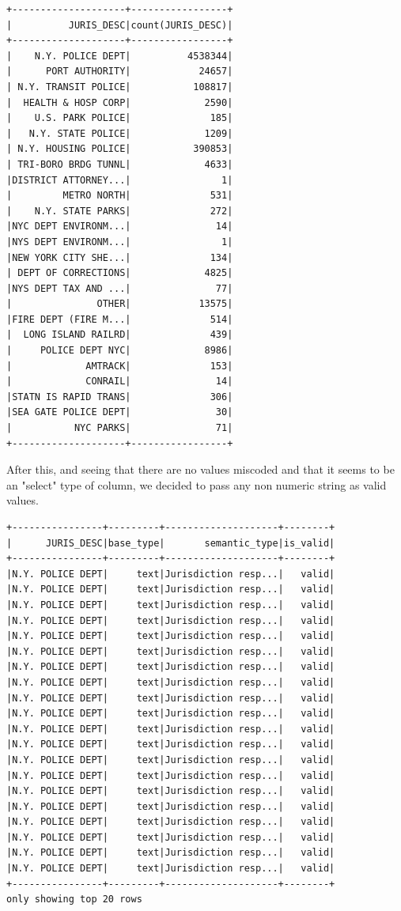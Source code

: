 \documentclass{article}
\begin{document}
\begin{itemize}
\begin{verbatim}
+--------------------+-----------------+
|          JURIS_DESC|count(JURIS_DESC)|
+--------------------+-----------------+
|    N.Y. POLICE DEPT|          4538344|
|      PORT AUTHORITY|            24657|
| N.Y. TRANSIT POLICE|           108817|
|  HEALTH & HOSP CORP|             2590|
|    U.S. PARK POLICE|              185|
|   N.Y. STATE POLICE|             1209|
| N.Y. HOUSING POLICE|           390853|
| TRI-BORO BRDG TUNNL|             4633|
|DISTRICT ATTORNEY...|                1|
|         METRO NORTH|              531|
|    N.Y. STATE PARKS|              272|
|NYC DEPT ENVIRONM...|               14|
|NYS DEPT ENVIRONM...|                1|
|NEW YORK CITY SHE...|              134|
| DEPT OF CORRECTIONS|             4825|
|NYS DEPT TAX AND ...|               77|
|               OTHER|            13575|
|FIRE DEPT (FIRE M...|              514|
|  LONG ISLAND RAILRD|              439|
|     POLICE DEPT NYC|             8986|
|             AMTRACK|              153|
|             CONRAIL|               14|
|STATN IS RAPID TRANS|              306|
|SEA GATE POLICE DEPT|               30|
|           NYC PARKS|               71|
+--------------------+-----------------+
\end{verbatim}

After this, and seeing that there are no values miscoded and that it seems to be an "select" type of column, we decided to pass any non numeric string as valid values. 

\begin{verbatim}
+----------------+---------+--------------------+--------+
|      JURIS_DESC|base_type|       semantic_type|is_valid|
+----------------+---------+--------------------+--------+
|N.Y. POLICE DEPT|     text|Jurisdiction resp...|   valid|
|N.Y. POLICE DEPT|     text|Jurisdiction resp...|   valid|
|N.Y. POLICE DEPT|     text|Jurisdiction resp...|   valid|
|N.Y. POLICE DEPT|     text|Jurisdiction resp...|   valid|
|N.Y. POLICE DEPT|     text|Jurisdiction resp...|   valid|
|N.Y. POLICE DEPT|     text|Jurisdiction resp...|   valid|
|N.Y. POLICE DEPT|     text|Jurisdiction resp...|   valid|
|N.Y. POLICE DEPT|     text|Jurisdiction resp...|   valid|
|N.Y. POLICE DEPT|     text|Jurisdiction resp...|   valid|
|N.Y. POLICE DEPT|     text|Jurisdiction resp...|   valid|
|N.Y. POLICE DEPT|     text|Jurisdiction resp...|   valid|
|N.Y. POLICE DEPT|     text|Jurisdiction resp...|   valid|
|N.Y. POLICE DEPT|     text|Jurisdiction resp...|   valid|
|N.Y. POLICE DEPT|     text|Jurisdiction resp...|   valid|
|N.Y. POLICE DEPT|     text|Jurisdiction resp...|   valid|
|N.Y. POLICE DEPT|     text|Jurisdiction resp...|   valid|
|N.Y. POLICE DEPT|     text|Jurisdiction resp...|   valid|
|N.Y. POLICE DEPT|     text|Jurisdiction resp...|   valid|
|N.Y. POLICE DEPT|     text|Jurisdiction resp...|   valid|
|N.Y. POLICE DEPT|     text|Jurisdiction resp...|   valid|
+----------------+---------+--------------------+--------+
only showing top 20 rows


\end{verbatim}
\end{itemize}
\end{document}
